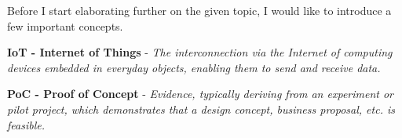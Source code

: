 \linebreak
Before I start elaborating further on the given topic, I would like to introduce a few important concepts.

\textbf{IoT - Internet of Things} - \textit{The interconnection via the Internet of computing devices embedded in everyday objects, enabling them to send and receive data.}\cite{IoT-dictionary}

\textbf{PoC - Proof of Concept} - \textit{Evidence, typically deriving from an experiment or pilot project, which demonstrates that a design concept, business proposal, etc. is feasible.} \cite{PoC-dictionary}
